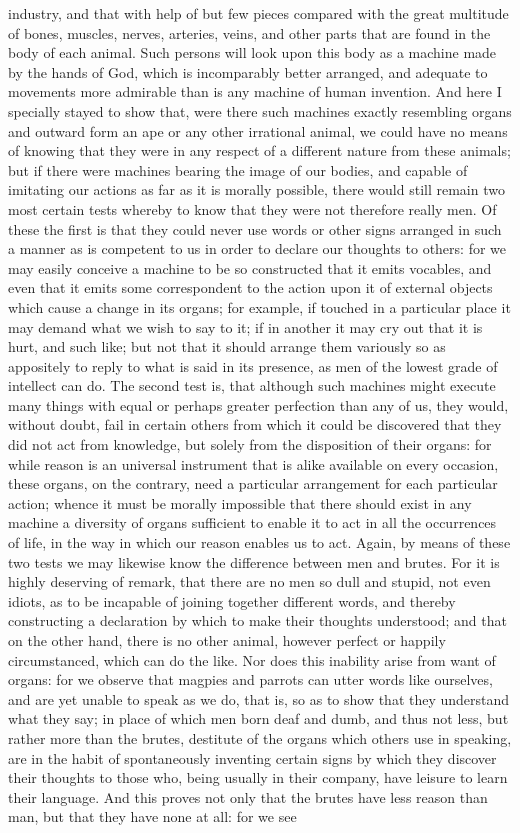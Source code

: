\documentclass[12pt]{article}
\begin{document}
industry, and that with help of but few pieces compared with the great multitude of bones, muscles, nerves, arteries, veins, and other parts that are found in the body of each animal. Such persons will look upon this body as a machine made by the hands of God, which is incomparably better arranged, and adequate to movements more admirable than is any machine of human invention. And here I specially stayed to show that, were there such machines exactly resembling organs and outward form an ape or any other irrational animal, we could have no means of knowing that they were in any respect of a different nature from these animals; but if there were machines bearing the image of our bodies, and capable of imitating our actions as far as it is morally possible, there would still remain two most certain tests whereby to know that they were not therefore really men. Of these the first is that they could never use words or other signs arranged in such a manner as is competent to us in order to declare our thoughts to others: for we may easily conceive a machine to be so constructed that it emits vocables, and even that it emits some correspondent to the action upon it of external objects which cause a change in its organs; for example, if touched in a particular place it may demand what we wish to say to it; if in another it may cry out that it is hurt, and such like; but not that it should arrange them variously so as appositely to reply to what is said in its presence, as men of the lowest grade of intellect can do. The second test is, that although such machines might execute many things with equal or perhaps greater perfection than any of us, they would, without doubt, fail in certain others from which it could be discovered that they did not act from knowledge, but solely from the disposition of their organs: for while reason is an universal instrument that is alike available on every occasion, these organs, on the contrary, need a particular arrangement for each particular action; whence it must be morally impossible that there should exist in any machine a diversity of organs sufficient to enable it to act in all the occurrences of life, in the way in which our reason enables us to act. Again, by means of these two tests we may likewise know the difference between men and brutes. For it is highly deserving of remark, that there are no men so dull and stupid, not even idiots, as to be incapable of joining together different words, and thereby constructing a declaration by which to make their thoughts understood; and that on the other hand, there is no other animal, however perfect or happily circumstanced, which can do the like. Nor does this inability arise from want of organs: for we observe that magpies and parrots can utter words like ourselves, and are yet unable to speak as we do, that is, so as to show that they understand what they say; in place of which men born deaf and dumb, and thus not less, but rather more than the brutes, destitute of the organs which others use in speaking, are in the habit of spontaneously inventing certain signs by which they discover their thoughts to those who, being usually in their company, have leisure to learn their language. And this proves not only that the brutes have less reason than man, but that they have none at all: for we see 
\end{document}
